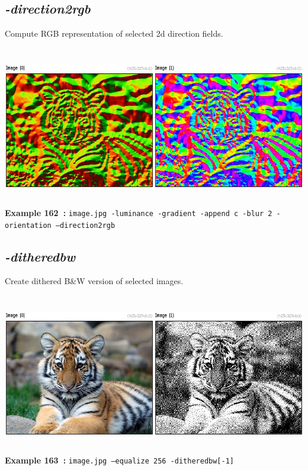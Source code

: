 \documentclass[a4paper,11pt,twoside]{book}
\begin{document}
\subsection{\emph{-direction2rgb} }\vspace*{-0.5em}
Compute RGB representation of selected 2d direction fields.
\begin{center}\includegraphics[keepaspectratio=true,height=7cm,width=\textwidth]{img/gmic_def162.jpg}\\
{\footnotesize \textbf{Example 162~:} \texttt{image.jpg -luminance -gradient -append c -blur 2 -orientation --direction2rgb}}
\end{center}

\subsection{\emph{-ditheredbw} }\vspace*{-0.5em}
Create dithered B\&W version of selected images.
\begin{center}\includegraphics[keepaspectratio=true,height=7cm,width=\textwidth]{img/gmic_def163.jpg}\\
{\footnotesize \textbf{Example 163~:} \texttt{image.jpg --equalize 256 -ditheredbw[-1]}}
\end{center}
\end{document}
